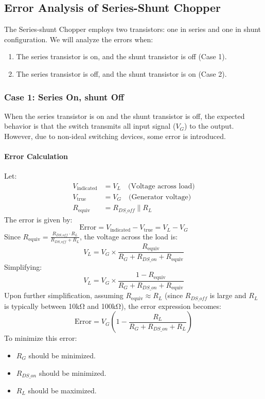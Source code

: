 \documentclass[a4paper,9pt,twoside,openany,twocolumn]{memoir}
\begin{document}
\subsection{Error Analysis of Series-Shunt Chopper}
The Series-shunt Chopper employs two transistors: one in series and one in shunt configuration. We will analyze the errors when:
\begin{enumerate}
    \item The series transistor is on, and the shunt transistor is off (Case 1).
    \item The series transistor is off, and the shunt transistor is on (Case 2).
\end{enumerate}

\subsubsection{Case 1: Series On, shunt Off}
When the series transistor is on and the shunt transistor is off, the expected behavior is that the switch transmits all input signal (\( V_G \)) to the output. However, due to non-ideal switching devices, some error is introduced.

\paragraph{Error Calculation}
Let:
\begin{align*}
V_{\text{indicated}} &= V_L \quad \text{(Voltage across load)} \\
V_{\text{true}} &= V_G \quad \text{(Generator voltage)} \\
R_{\text{equiv}} &= R_{DS\_off} \parallel R_L
\end{align*}
The error is given by:
\[
\text{Error} = V_{\text{indicated}} - V_{\text{true}} = V_L - V_G
\]
Since \( R_{\text{equiv}} = \frac{R_{DS\_off} \cdot R_L}{R_{DS\_off} + R_L} \), the voltage across the load is:
\[
V_L = V_G \times \frac{R_{\text{equiv}}}{R_G + R_{DS\_on} + R_{\text{equiv}}}
\]
Simplifying:
\[
V_L = V_G \times \frac{1 - R_{\text{equiv}}}{R_G + R_{DS\_on} + R_{\text{equiv}}}
\]
Upon further simplification, assuming \( R_{\text{equiv}} \approx R_L \) (since \( R_{DS\_off} \) is large and \( R_L \) is typically between 10kΩ and 100kΩ), the error expression becomes:
\[
\text{Error} = V_G \left(1 - \frac{R_L}{R_G + R_{DS\_on} + R_L}\right)
\]
To minimize this error:
\begin{itemize}
    \item \( R_G \) should be minimized.
    \item \( R_{DS\_on} \) should be minimized.
    \item \( R_L \) should be maximized.
\end{itemize}
\end{document}
